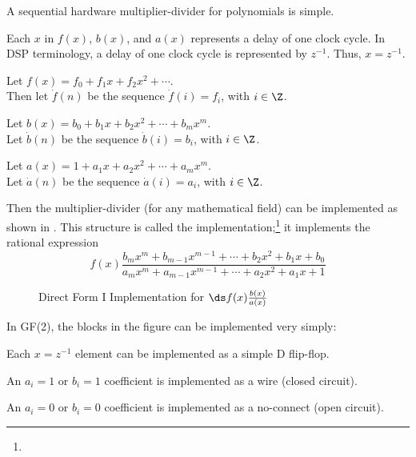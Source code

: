 A sequential hardware multiplier-divider for polynomials is simple.
\begin{liste}
   \item Each $x$ in $f(x)$, $b(x)$, and $a(x)$ represents a delay of one clock cycle.
In DSP terminology, a delay of one clock cycle is represented by $z^{-1}$.
Thus, $x=z^{-1}$.
   \item Let $f(x)=f_0 + f_1x + f_2x^2 + \cdots$.\\
         Then let $\dot{f}(n)$ be the sequence $\dot{f}(i)=f_i$, with $i\in\Z$.
   \item Let $b(x)= b_0 + b_1x + b_2x^2 + \cdots + b_mx^m$.\\
         Let $\dot{b}(n)$ be the sequence $\dot{b}(i)=b_i$, with $i\in\Z$.
   \item Let $a(x)=1 + a_1x + a_2x^2 + \cdots + a_mx^m$.\\
         Let $\dot{a}(n)$ be the sequence $\dot{a}(i)=a_i$, with $i\in\Z$.
\end{liste}
Then the multiplier-divider (for any mathematical field) can be implemented as shown
in .  
This structure is called the  implementation;\footnote{}
it implements the rational expression
\[
   f(x) \frac{b_mx^m + b_{m-1}x^{m-1} + \cdots + b_2x^2 + b_1x + b_0}
             {a_mx^m + a_{m-1}x^{m-1} + \cdots + a_2x^2 + a_1x + 1  }
\]

\begin{figure}[ht]
\caption{
   Direct Form I Implementation for $\ds f(x)\frac{b(x)}{a(x)}$
   \label{fig:df1}
   }
\end{figure}

In GF(2), the blocks in the figure can be implemented very simply:
\begin{liste}
   \item Each $x=z^{-1}$ element can be implemented as a simple D flip-flop.
   \item An $a_i=1$ or $b_i=1$ coefficient is implemented as a wire (closed circuit).
   \item An $a_i=0$ or $b_i=0$ coefficient is implemented as a no-connect (open circuit).
\end{liste}

